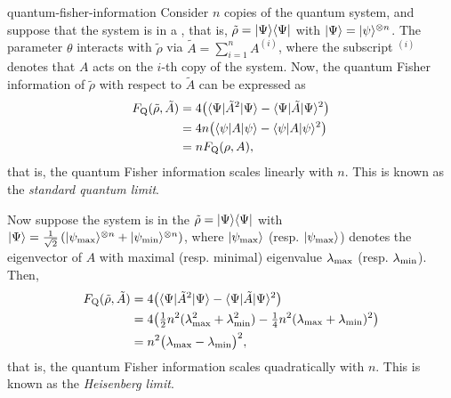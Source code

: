 \begin{example}{quantum-fisher-information}
    Consider $n$ copies of the quantum system, and suppose that the system is in a , that is, $\tilde{\rho} = |\Psi\rangle \langle\Psi|$ with $|\Psi\rangle = |\psi\rangle^{\otimes n}$. The parameter $\theta$ interacts with $\tilde{\rho}$ via $\tilde{A} = \sum_{i = 1}^{n} A^{(i)}$, where the subscript $^{(i)}$ denotes that $A$ acts on the $i$-th copy of the system. Now, the quantum Fisher information of $\tilde{\rho}$ with respect to $\tilde{A}$ can be expressed as
    \[ \begin{aligned}
        F_\textup{Q}(\tilde{\rho}, \tilde{A})
            &= 4 \big( \langle\Psi| \tilde{A}^2 |\Psi\rangle - \langle\Psi| \tilde{A} |\Psi\rangle^2 \big) \\
            &= 4 n \big( \langle\psi| A |\psi\rangle - \langle\psi| A |\psi\rangle^2 \big) \\
            &= n F_\textup{Q}(\rho, A) ,
    \end{aligned} \]
    that is, the quantum Fisher information scales linearly with $n$. This is known as the \textit{standard quantum limit}.
    
    Now suppose the system is in the  $\tilde{\rho} = |\Psi\rangle \langle\Psi|$ with $|\Psi\rangle = \frac{1}{\sqrt{2}} \left( |\psi_\textup{max}\rangle^{\otimes n} + |\psi_\textup{min}\rangle^{\otimes n} \right)$, where $|\psi_\textup{max}\rangle$ (resp. $|\psi_\textup{max}\rangle$) denotes the eigenvector of $A$ with maximal (resp. minimal) eigenvalue $\lambda_\textup{max}$ (resp. $\lambda_\textup{min}$). Then,
    \[ \begin{aligned}
        F_\textup{Q}(\tilde{\rho}, \tilde{A})
            &= 4 \big( \langle\Psi| \tilde{A}^2 |\Psi\rangle - \langle\Psi| \tilde{A} |\Psi\rangle^2 \big) \\
            &= 4 \big( \tfrac{1}{2} n^2 (\lambda_\textup{max}^2 + \lambda_\textup{min}^2) - \tfrac{1}{4} n^2 (\lambda_\textup{max} + \lambda_\textup{min})^2 \big) \\
            &= n^2 \big( \lambda_\textup{max} - \lambda_\textup{min} \big)^2 ,
    \end{aligned} \]
    that is, the quantum Fisher information scales quadratically with $n$. This is known as the \textit{Heisenberg limit}.
\end{example}
